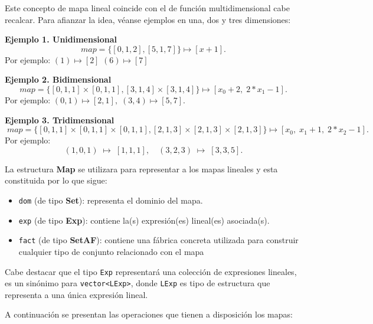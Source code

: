 Este concepto de mapa lineal coincide con el de función multidimensional cabe recalcar. Para afianzar la idea, véanse ejemplos en una, dos y tres dimensiones:

\medskip

\textbf{Ejemplo 1. Unidimensional}
\[
\mathit{map} = \{[0,1,2],[5,1,7]\}\mapsto[x+1].
\]
Por ejemplo: \((1)\!\mapsto\![2]\) \((6)\!\mapsto\![7]\)

\medskip

\textbf{Ejemplo 2. Bidimensional}
\[
\mathit{map}=\{[0,1,1]\times[0,1,1],[3,1,4]\times[3,1,4]\}
\mapsto[x_0+2,\;2*x_1-1].
\]
Por ejemplo:
\((0,1)\!\mapsto\![2,1],\;(3,4)\!\mapsto\![5,7].\)

\medskip

\textbf{Ejemplo 3. Tridimensional}
\[\;
\mathit{map} = \{[0,1,1]\times[0,1,1]\times[0,1,1],
                 [2,1,3]\times[2,1,3]\times[2,1,3]\}
\mapsto[x_{0},\;x_{1}+1,\;2*x_{2}-1].
\]
Por ejemplo:
\[
(1,0,1)\;\mapsto\;[1,1,1],\quad
(3,2,3)\;\mapsto\;[3,3,5].
\]

La estructura \textbf{Map} se utilizara para representar a los mapas lineales y esta constituida por lo que sigue:

\begin{itemize}
  \item \texttt{dom} (de tipo \textbf{Set}): representa el dominio del mapa.
  \item \texttt{exp} (de tipo \textbf{Exp}): contiene la(s) expresión(es) lineal(es) asociada(s).
    \item \texttt{fact} (de tipo \textbf{SetAF}): contiene una fábrica concreta utilizada para construir cualquier tipo de conjunto relacionado con el mapa
\end{itemize}

Cabe destacar que el tipo \texttt{Exp} representará una colección de expresiones lineales, es un sinónimo para \texttt{vector<LExp>}, donde \texttt{LExp} es tipo de estructura que representa a una única expresión lineal.

A continuación se presentan las operaciones que tienen a disposición los mapas:

